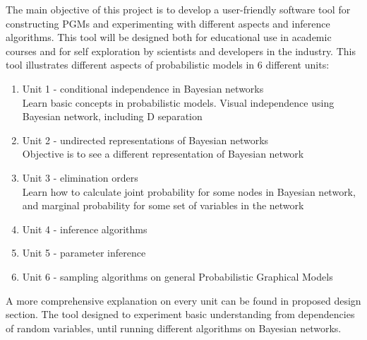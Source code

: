 \documentclass{article}
\begin{document}
    The main objective of this project is to develop a user-friendly software tool for constructing PGMs and experimenting with different aspects and inference algorithms. This tool will be designed both for educational use in academic courses and for self exploration by scientists and developers in the industry. This tool illustrates different aspects of probabilistic models in 6 different units:
    \begin{enumerate}
        \item Unit 1 - conditional independence in Bayesian networks\\
                Learn basic concepts in probabilistic models. Visual independence using Bayesian network, including D separation
        \item Unit 2 - undirected representations of Bayesian networks\\
                Objective is to see a different representation of Bayesian network
        \item Unit 3 - elimination orders\\
                Learn how to calculate joint probability for some nodes in Bayesian network, and marginal probability for some set of variables in the network
        \item Unit 4 - inference algorithms
        \item Unit 5 - parameter inference
        \item Unit 6 - sampling algorithms on general Probabilistic Graphical Models
    \end{enumerate}
    A more comprehensive explanation on every unit can be found in proposed design section. The tool designed to experiment basic understanding from dependencies of random variables, until running different algorithms on Bayesian networks.\\~\\
\end{document}
